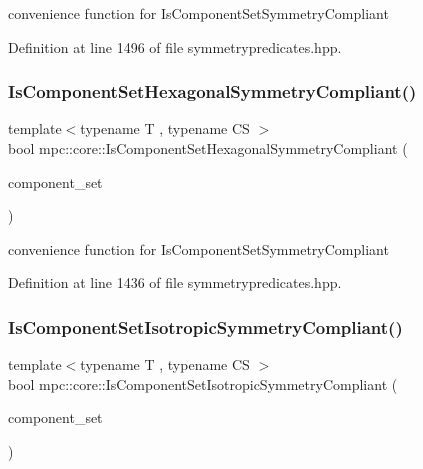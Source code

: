 convenience function for Is\+Component\+Set\+Symmetry\+Compliant 



Definition at line 1496 of file symmetrypredicates.\+hpp.

\mbox{\label{namespacempc_1_1core_a5fba223541d3c2615a86a32de49e1bc4}} 
\subsubsection{\texorpdfstring{Is\+Component\+Set\+Hexagonal\+Symmetry\+Compliant()}{IsComponentSetHexagonalSymmetryCompliant()}}
{\footnotesize\ttfamily template$<$typename T , typename CS $>$ \\
bool mpc\+::core\+::\+Is\+Component\+Set\+Hexagonal\+Symmetry\+Compliant (\begin{DoxyParamCaption}\item[{const std\+::set$<$ \mbox{\hyperlink{namespacempc_1_1core_ac3a232afc7c680d580628e834030482f}{mpc\+::core\+::\+Tensor\+Rank4\+Component}}$<$ T $>$ $>$ \&}]{component\+\_\+set }\end{DoxyParamCaption})}



convenience function for Is\+Component\+Set\+Symmetry\+Compliant 



Definition at line 1436 of file symmetrypredicates.\+hpp.

\mbox{\label{namespacempc_1_1core_a0aee7acb4257605a58b75db9365f8f87}} 
\subsubsection{\texorpdfstring{Is\+Component\+Set\+Isotropic\+Symmetry\+Compliant()}{IsComponentSetIsotropicSymmetryCompliant()}}
{\footnotesize\ttfamily template$<$typename T , typename CS $>$ \\
bool mpc\+::core\+::\+Is\+Component\+Set\+Isotropic\+Symmetry\+Compliant (\begin{DoxyParamCaption}\item[{const std\+::set$<$ \mbox{\hyperlink{namespacempc_1_1core_ac3a232afc7c680d580628e834030482f}{mpc\+::core\+::\+Tensor\+Rank4\+Component}}$<$ T $>$ $>$ \&}]{component\+\_\+set }\end{DoxyParamCaption})}



